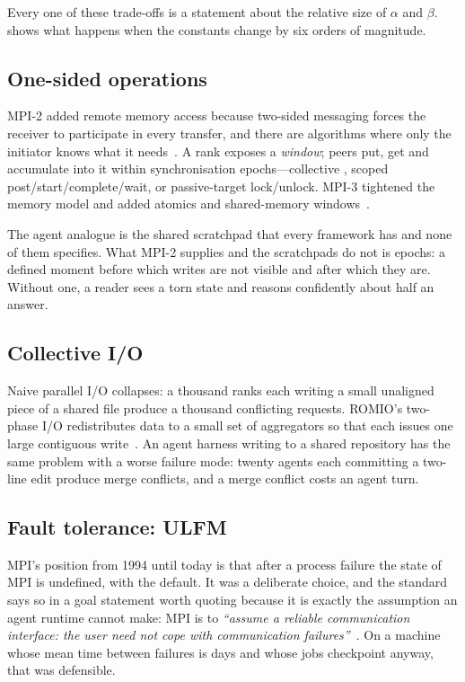 Every one of these trade-offs is a statement about the relative size of
$\alpha$ and $\beta$.  shows what happens when the constants
change by six orders of magnitude.

\subsection{One-sided operations}

MPI-2 added remote memory access because two-sided messaging forces the
receiver to participate in every transfer, and there are algorithms where
only the initiator knows what it needs~\cite{mpi-forum-1997-mpi20}. A rank
exposes a \emph{window}; peers put, get and accumulate into it within
synchronisation epochs---collective , scoped
post/start/complete/wait, or passive-target lock/unlock. MPI-3 tightened the
memory model and added atomics and shared-memory
windows~\cite{dinan2016rma}.

The agent analogue is the shared scratchpad that every framework has and
none of them specifies. What MPI-2 supplies and the scratchpads do not is
epochs: a defined moment before which writes are not visible and after which
they are. Without one, a reader sees a torn state and reasons confidently
about half an answer.

\subsection{Collective I/O}

Naive parallel I/O collapses: a thousand ranks each writing a small
unaligned piece of a shared file produce a thousand conflicting requests.
ROMIO's two-phase I/O redistributes data to a small set of aggregators so
that each issues one large contiguous write~\cite{Thakur1999}. An
agent harness writing to a shared repository has the same problem with a
worse failure mode: twenty agents each committing a two-line edit produce
merge conflicts, and a merge conflict costs an agent turn.

\subsection{Fault tolerance: ULFM}

MPI's position from 1994 until today is that after a process failure the
state of MPI is undefined, with  the default. It
was a deliberate choice, and the standard says so in a goal statement worth
quoting because it is exactly the assumption an agent runtime cannot
make: MPI is to \emph{``assume a reliable communication interface: the user
need not cope with communication failures''}~\cite{mpi-forum-1994}. On a
machine whose mean time between failures is days and whose jobs checkpoint
anyway, that was defensible.

